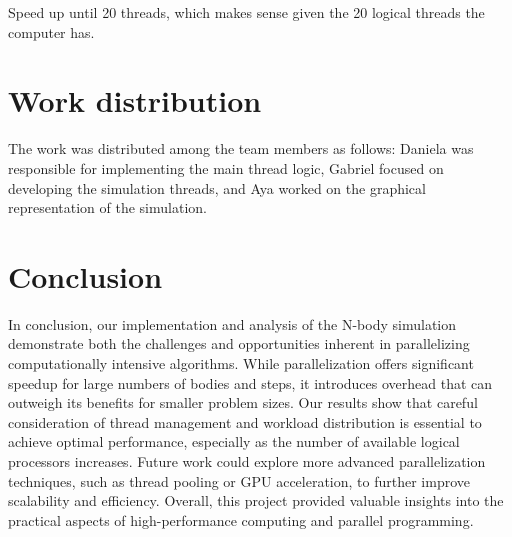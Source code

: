 \documentclass{article}
\begin{document}
Speed up until 20 threads, which makes sense given the 20 logical threads the computer has.		

\section{Work distribution}
The work was distributed among the team members as follows: Daniela was responsible for implementing the main thread logic, Gabriel focused on developing the simulation threads, and Aya worked on the graphical representation of the simulation.

\section{Conclusion}
In conclusion, our implementation and analysis of the N-body simulation demonstrate both the challenges and opportunities inherent in parallelizing computationally intensive algorithms. While parallelization offers significant speedup for large numbers of bodies and steps, it introduces overhead that can outweigh its benefits for smaller problem sizes. Our results show that careful consideration of thread management and workload distribution is essential to achieve optimal performance, especially as the number of available logical processors increases. Future work could explore more advanced parallelization techniques, such as thread pooling or GPU acceleration, to further improve scalability and efficiency. Overall, this project provided valuable insights into the practical aspects of high-performance computing and parallel programming.
\end{document}
